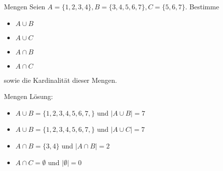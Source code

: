 \documentclass[handout]{beamer}
\begin{document}
\begin{frame}{Mengen}
	Seien $A=\{1,2,3,4\}, B=\{3,4,5,6,7\}, C=\{5,6,7\}$. Bestimme
	\begin{itemize}
		\item $A \cup B$
		\item $A \cup C$
		\item $A \cap B$
		\item $A \cap C$
	\end{itemize}
	sowie die Kardinalität dieser Mengen.
\end{frame}
\begin{frame}{Mengen}
	Lösung:
	\begin{itemize}
		\item $A \cup B = \{1,2,3,4,5,6,7,\}$ und $\mid A \cup B\mid = 7$
		\pause
		\item $A \cup B = \{1,2,3,4,5,6,7,\}$ und $\mid A \cup C\mid = 7$
		\pause
		\item $A \cap B = \{3,4\}$ und $\mid A \cap B \mid = 2$
		\pause
		\item $A \cap C = \emptyset$ und $\mid\emptyset\mid = 0$
	\end{itemize}
\end{frame}
\end{document}
